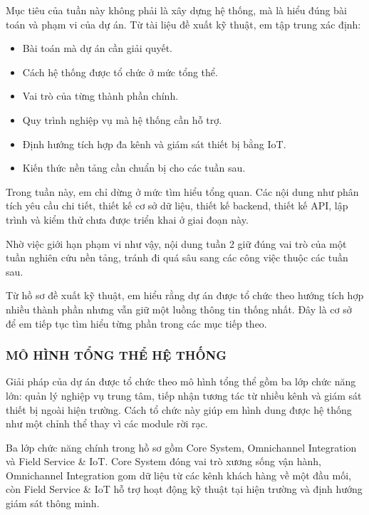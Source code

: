 
Mục tiêu của tuần này không phải là xây dựng hệ thống, mà là hiểu đúng bài toán và phạm vi của dự án. Từ tài liệu đề xuất kỹ thuật, em tập trung xác định:

\begin{itemize}
    \item Bài toán mà dự án cần giải quyết.
    \item Cách hệ thống được tổ chức ở mức tổng thể.
    \item Vai trò của từng thành phần chính.
    \item Quy trình nghiệp vụ mà hệ thống cần hỗ trợ.
    \item Định hướng tích hợp đa kênh và giám sát thiết bị bằng IoT.
    \item Kiến thức nền tảng cần chuẩn bị cho các tuần sau.
\end{itemize}


Trong tuần này, em chỉ dừng ở mức tìm hiểu tổng quan. Các nội dung như phân tích yêu cầu chi tiết, thiết kế cơ sở dữ liệu, thiết kế backend, thiết kế API, lập trình và kiểm thử chưa được triển khai ở giai đoạn này.

Nhờ việc giới hạn phạm vi như vậy, nội dung tuần 2 giữ đúng vai trò của một tuần nghiên cứu nền tảng, tránh đi quá sâu sang các công việc thuộc các tuần sau.


Từ hồ sơ đề xuất kỹ thuật, em hiểu rằng dự án được tổ chức theo hướng tích hợp nhiều thành phần nhưng vẫn giữ một luồng thông tin thống nhất. Đây là cơ sở để em tiếp tục tìm hiểu từng phần trong các mục tiếp theo.

\subsubsection{MÔ HÌNH TỔNG THỂ HỆ THỐNG}


Giải pháp của dự án được tổ chức theo mô hình tổng thể gồm ba lớp chức năng lớn: quản lý nghiệp vụ trung tâm, tiếp nhận tương tác từ nhiều kênh và giám sát thiết bị ngoài hiện trường. Cách tổ chức này giúp em hình dung được hệ thống như một chỉnh thể thay vì các module rời rạc.

Ba lớp chức năng chính trong hồ sơ gồm Core System, Omnichannel Integration và Field Service \& IoT. Core System đóng vai trò xương sống vận hành, Omnichannel Integration gom dữ liệu từ các kênh khách hàng về một đầu mối, còn Field Service \& IoT hỗ trợ hoạt động kỹ thuật tại hiện trường và định hướng giám sát thông minh.

